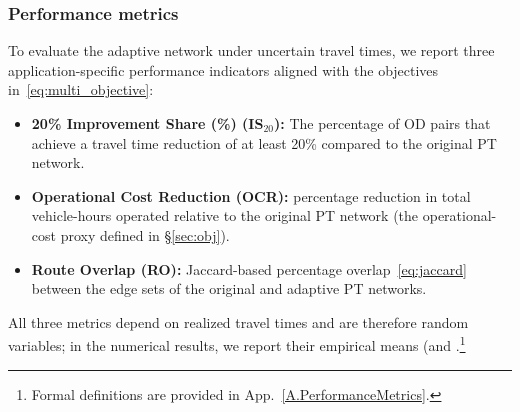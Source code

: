 \documentclass[a4paper,fleqn]{cas-sc}
\begin{document}
\subsubsection{Performance metrics}\label{sec:performMETRICS}

To evaluate the adaptive network under uncertain travel times, we report three
application-specific performance indicators aligned with the objectives
in~\eqref{eq:multi_objective}:

\begin{itemize}
    \item \textbf{20\% Improvement Share (\%) (IS$_{20}$):} The percentage of OD pairs that achieve a travel time reduction of at least 20\% compared to the original PT network.
    \item \textbf{Operational Cost Reduction (OCR):} percentage reduction in
    total vehicle-hours operated relative to the original PT network (the operational-cost proxy defined in \S\ref{sec:obj}).
    \item \textbf{Route Overlap (RO):} Jaccard-based percentage overlap~\eqref{eq:jaccard} between the edge sets of the original and adaptive PT networks.
\end{itemize}

All three metrics depend on realized travel times and are therefore random
variables; in the numerical results, we report their empirical means (and
.\footnote{Formal definitions are provided in App.~\ref{A.PerformanceMetrics}.}

\end{document}
